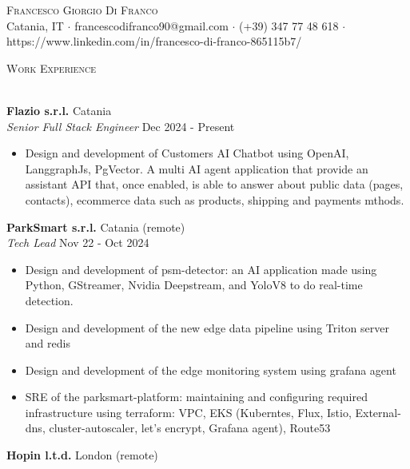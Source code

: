 \documentclass[a4paper]{article}
\newcommand{\lineunder} {
    \vspace*{-8pt} \\
    \hspace*{-18pt} \hrulefill \\
}
\newcommand{\header} [1] {
    {\hspace*{-18pt}\vspace*{6pt} \textsc{#1}}
    \vspace*{-6pt} \lineunder
}
\begin{document}
\vspace*{-40pt}

    

\vspace*{-10pt}
\begin{center}
	{\Huge \scshape {Francesco Giorgio Di Franco}}\\
	Catania, IT $\cdot$ francescodifranco90@gmail.com $\cdot$ (+39) 347 77 48 618 $\cdot$ https://www.linkedin.com/in/francesco-di-franco-865115b7/\\
\end{center}

\header{Work Experience}
\vspace{1mm}

\textbf{Flazio s.r.l.} \hfill Catania\\
\textit{Senior Full Stack Engineer} \hfill Dec 2024 - Present\\
\vspace{-1mm}
\begin{itemize} \itemsep 1pt
	\item Design and development of Customer\textquotesingle{}s AI Chatbot using OpenAI, LanggraphJs, PgVector. A multi AI agent application that provide an assistant API that, once enabled, is able to answer about public data (pages, contacts), ecommerce data such as products, shipping and payments mthods.
\end{itemize}
\textbf{ParkSmart s.r.l.} \hfill Catania (remote)\\
\textit{Tech Lead} \hfill Nov 22 - Oct 2024\\
\vspace{-1mm}
\begin{itemize} \itemsep 1pt
	\item Design and development of psm-detector: an AI application made using Python, GStreamer, Nvidia Deepstream, and YoloV8 to do real-time detection.
	\item Design and development of the new edge data pipeline using Triton server and redis
	\item Design and development of the edge monitoring system using grafana agent
	\item SRE of the parksmart-platform: maintaining and configuring required infrastructure using terraform: VPC, EKS (Kuberntes, Flux, Istio, External-dns, cluster-autoscaler, let’s encrypt, Grafana agent), Route53
\end{itemize}
\textbf{Hopin l.t.d.} \hfill London (remote)\\
\end{document}
